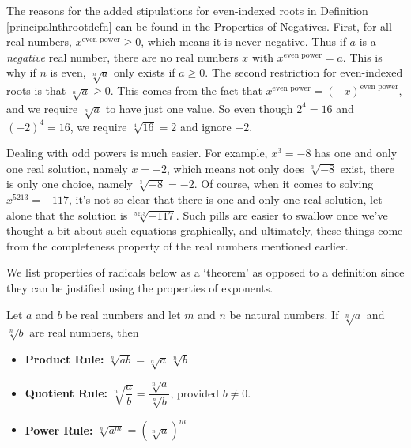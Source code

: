 \medskip

The reasons for the added stipulations for even-indexed roots in Definition \ref{principalnthrootdefn} can be found in the Properties of Negatives.  First, for all real numbers,  $x^{\text{even power}} \geq 0$, which means it is never negative.  Thus if $a$ is a \textit{negative} real number, there are no real numbers $x$ with $x^{\text{even power}} = a$.  This is why if $n$ is even, $\sqrt[n]{a}$ only exists if $a \geq 0$.  The second restriction for even-indexed roots is that $\sqrt[n]{a} \geq 0$.  This comes from the fact that $x^{\text{even power}} = (-x)^{\text{even power}}$, and we require $\sqrt[n]{a}$ to have just one value.  So even though $2^{4} = 16$ and $(-2)^{4} = 16$, we require $\sqrt[4]{16} = 2$ and ignore $-2$.  

\smallskip

Dealing with odd powers is much easier. For example, $x^3 = -8$ has one and only one real solution, namely $x = -2$, which means not only does $\sqrt[3]{-8}$ exist, there is only one choice, namely $\sqrt[3]{-8} = -2$. Of course, when it comes to solving $x^{5213} = -117$, it's not so clear that there is one and only one real solution, let alone that the solution is $\sqrt[5213]{-117}$. Such pills are easier to swallow once we've thought a bit about such equations graphically, and ultimately, these things come from the completeness property of the real numbers mentioned earlier.  

\smallskip

We list properties of radicals below as a `theorem' as opposed to a definition since they can be justified using the properties of exponents.

\medskip

\colorbox{ResultColor}{\bbm
\begin{thm} 
Let $a$ and $b$ be real numbers and let $m$ and $n$ be natural numbers.  If $\sqrt[n]{a}$ and $\sqrt[n]{b}$ are real numbers, then

\label{radicalprops}

\begin{itemize}

\item  \textbf{Product Rule:}  $\sqrt[n]{ab} = \sqrt[n]{a} \, \sqrt[n]{b}$ 

\item  \textbf{Quotient Rule:}  $\sqrt[n]{\dfrac{a}{b}} = \dfrac{\sqrt[n]{a}}{\sqrt[n]{b}}$, provided $b \neq 0$. 

\item  \textbf{Power Rule:} $\sqrt[n]{a^m} = \left(\sqrt[n]{a}\right)^m$ 

\end{itemize}

\end{thm}

\ebm}

